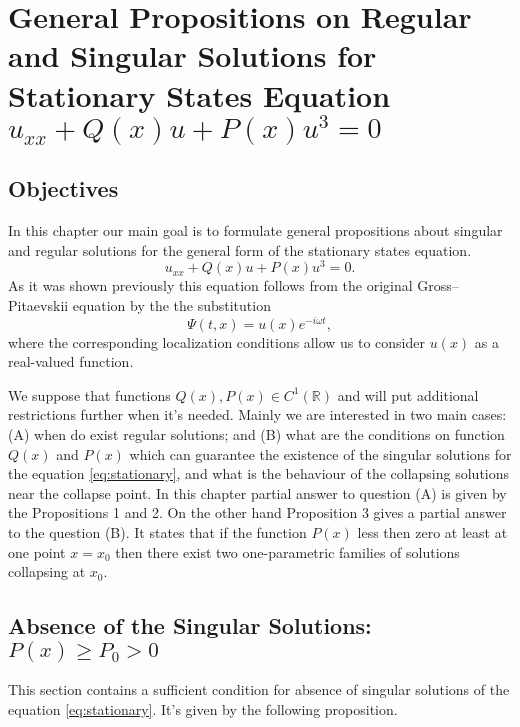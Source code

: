 \chapter{General Propositions on Regular and Singular Solutions for Stationary States Equation $u_{xx} + Q(x) u + P(x) u^3 = 0$}

\section{Objectives}

In this chapter our main goal is to formulate general propositions about singular and regular solutions for the general form of the stationary states equation.
\begin{equation}
	u_{xx} + Q(x) u + P(x) u^3 = 0.
	\label{eq:stationary}
\end{equation}
As it was shown previously this equation follows from the original Gross--Pitaevskii equation by the the substitution
\begin{equation}
	\Psi(t, x) = u(x) e^{-i \omega t},
\end{equation}
where the corresponding localization conditions allow us to consider $u(x)$ as a real-valued function.

We suppose that functions $Q(x), P(x) \in C^1(\mathbb{R})$ and will put additional restrictions further when it's needed.
Mainly we are interested in two main cases: (A) when do exist regular solutions; and (B) what are the conditions on function $Q(x)$ and $P(x)$ which can guarantee the existence of the singular solutions for the equation \eqref{eq:stationary}, and what is the behaviour of the collapsing solutions near the collapse point.
In this chapter partial answer to question (A) is given by the Propositions 1 and 2.
On the other hand Proposition 3 gives a partial answer to the question (B).
It states that if the function $P(x)$ less then zero at least at one point $x = x_0$ then there exist two one-parametric families of solutions collapsing at $x_0$.

\section{Absence of the Singular Solutions: $P(x) \ge P_0 > 0$}

This section contains a sufficient condition for absence of singular solutions of the equation \eqref{eq:stationary}.
It's given by the following proposition.

